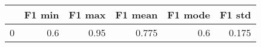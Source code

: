 \begin{tabular}{lrrrrr}
\toprule
{} &  F1 min &  F1 max &  F1 mean &  F1 mode &  F1 std \\
\midrule
0 &     0.6 &    0.95 &    0.775 &      0.6 &   0.175 \\
\bottomrule
\end{tabular}
